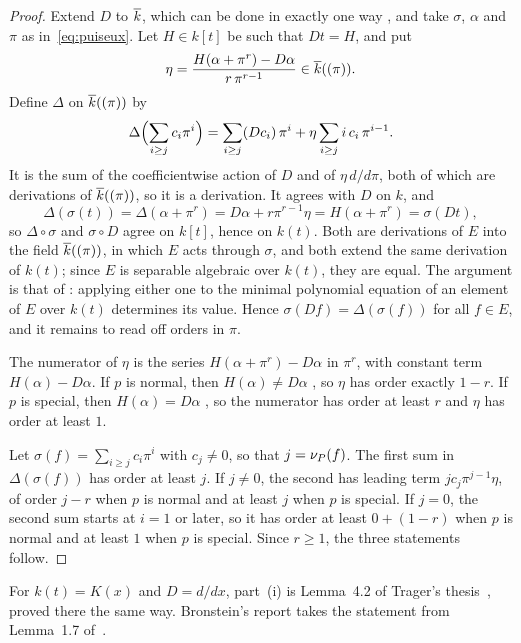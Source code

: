 \begin{proof}
Extend $D$ to $\overline{k}$, which can be done in exactly one way
, and take $\sigma$, $\alpha$ and $\pi$ as
in~\eqref{eq:puiseux}. Let $H \in k[t]$ be such that $Dt = H$, and put
\[
  \eta = \frac{H(\alpha + \pi^r) - D\alpha}{r\,\pi^{r-1}} \in \overline{k}((\pi)).
\]
Define $\Delta$ on $\overline{k}((\pi))$ by
\[
  \Delta \Bigl( \sum_{i \ge j} c_i \pi^i \Bigr)
    = \sum_{i \ge j} (Dc_i)\, \pi^i
      + \eta \sum_{i \ge j} i\, c_i\, \pi^{i-1} .
\]
It is the sum of the coefficientwise action of $D$ and of $\eta\, d/d\pi$, both
of which are derivations of $\overline{k}((\pi))$, so it is a derivation. It agrees
with $D$ on $k$, and
\[
  \Delta(\sigma(t)) = \Delta(\alpha + \pi^r) = D\alpha + r \pi^{r-1} \eta
    = H(\alpha + \pi^r) = \sigma(Dt),
\]
so $\Delta \circ \sigma$ and $\sigma \circ D$ agree on $k[t]$, hence on $k(t)$.
Both are derivations of $E$ into the field $\overline{k}((\pi))$, in which $E$ acts
through $\sigma$, and both extend the same derivation of $k(t)$; since $E$ is
separable algebraic over $k(t)$, they are equal. The argument is that of
: applying either one to the minimal polynomial equation of
an element of $E$ over $k(t)$ determines its value. Hence $\sigma(Df) = \Delta(\sigma(f))$ for all
$f \in E$, and it remains to read off orders in $\pi$.

The numerator of $\eta$ is the series $H(\alpha + \pi^r) - D\alpha$ in $\pi^r$,
with constant term $H(\alpha) - D\alpha$. If $p$ is normal, then $H(\alpha) \ne
D\alpha$ , so $\eta$ has order exactly $1 - r$. If $p$ is
special, then $H(\alpha) = D\alpha$ , so the numerator has
order at least $r$ and $\eta$ has order at least $1$.

Let $\sigma(f) = \sum_{i \ge j} c_i \pi^i$ with $c_j \ne 0$, so that $j =
\nu_{P}(f)$. The first sum in $\Delta(\sigma(f))$ has order at least $j$. If
$j \ne 0$, the second has leading term $j c_j \pi^{j-1} \eta$, of order $j - r$
when $p$ is normal and at least $j$ when $p$ is special. If $j = 0$, the
second sum starts at $i = 1$ or later, so it has order at least $0 + (1 - r)$
when $p$ is normal and at least $1$ when $p$ is special. Since $r \ge 1$, the
three statements follow.
\end{proof}

For $k(t) = K(x)$ and $D = d/dx$, part~(i) is Lemma~4.2 of Trager's
thesis~\cite[\S4.2]{trager1984}, proved there the same way. Bronstein's
report takes the statement from Lemma~1.7 of~\cite{bronstein1990}.

